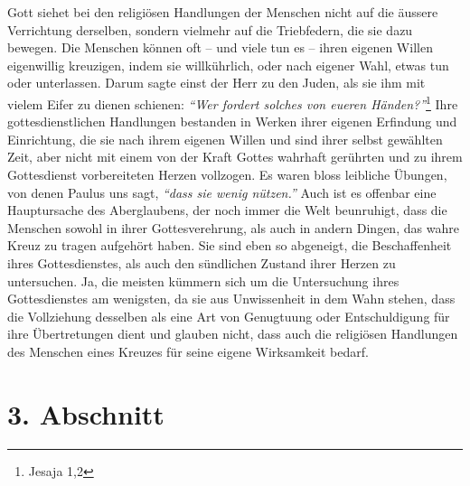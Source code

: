   Gott siehet bei den religiösen
Handlungen der Menschen nicht auf die äussere
Verrichtung derselben, sondern vielmehr auf die Triebfedern, die sie dazu
bewegen.  Die Menschen können oft -- und viele
tun es -- ihren eigenen Willen
eigenwillig kreuzigen, indem sie willkührlich, oder nach eigener Wahl, etwas
tun oder
unterlassen. Darum sagte einst der Herr zu den Juden, als
sie ihm
mit vielem
Eifer zu dienen schienen:
\textit{"`Wer fordert solches von eueren Händen?"'}\footnote{Jesaja 1,2}
 Ihre
gottesdienstlichen Handlungen bestanden in Werken ihrer eigenen Erfindung und
Einrichtung, die sie nach ihrem eigenen Willen und sind ihrer selbst gewählten
Zeit, aber nicht mit einem von der Kraft Gottes wahrhaft gerührten und zu ihrem
Gottesdienst vorbereiteten Herzen vollzogen. Es waren bloss leibliche Übungen,
von denen
Paulus uns sagt,
\textit{"`dass sie wenig nützen."'} Auch ist es offenbar eine
Hauptursache des Aberglaubens, der noch
immer die Welt beunruhigt, dass die Menschen sowohl in ihrer Gottesverehrung,
als auch in andern Dingen, das wahre Kreuz zu tragen aufgehört haben. Sie sind
eben so abgeneigt, die Beschaffenheit ihres Gottesdienstes, als auch den
sündlichen Zustand ihrer Herzen zu untersuchen. Ja,
die meisten kümmern sich um die Untersuchung ihres Gottesdienstes am
wenigsten, da sie aus Unwissenheit in
dem Wahn stehen, dass die Vollziehung desselben als eine Art von Genugtuung
oder Entschuldigung für ihre Übertretungen dient und glauben nicht, dass auch
die religiösen Handlungen des Menschen eines Kreuzes für seine eigene
Wirksamkeit bedarf.

\section{3. Abschnitt} \label{kap6_ab3}

